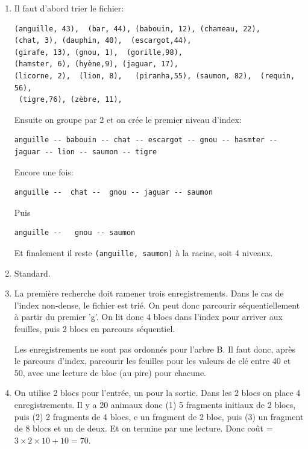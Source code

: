 \begin{solution}
\begin{enumerate}
  \item Il faut d'abord trier le fichier:
\begin{verbatim}
(anguille, 43),  (bar, 44), (babouin, 12), (chameau, 22),  
(chat, 3), (dauphin, 40),  (escargot,44),
(girafe, 13), (gnou, 1),  (gorille,98), 
(hamster, 6), (hyène,9), (jaguar, 17),  
(licorne, 2),  (lion, 8),   (piranha,55), (saumon, 82),  (requin, 56),
 (tigre,76), (zèbre, 11),
\end{verbatim}
 Ensuite on groupe par 2 et on crée le premier niveau d'index:
\begin{verbatim}
anguille -- babouin -- chat -- escargot -- gnou -- hasmter --
jaguar -- lion -- saumon -- tigre
\end{verbatim}

Encore une fois:
\begin{verbatim}
anguille --  chat --  gnou -- jaguar -- saumon 
\end{verbatim}

Puis
\begin{verbatim}
anguille --   gnou -- saumon 
\end{verbatim}

Et finalement il reste \texttt{(anguille, saumon)} à la racine, soit 4 niveaux.

  \item Standard.

  \item La première recherche doit ramener trois enregistrements. 
  Dans le cas de l'index non-dense, le fichier est trié.
     On peut donc parcourir séquentiellement à partir du
  premier 'g'. On lit donc 4 blocs dans l'index pour arriver aux feuilles, 
  puis 2 blocs en parcours séquentiel.
  
  Les enregistrements ne sont pas ordonnés pour l'arbre B. Il faut donc, après le
  parcours d'index, parcourir les feuilles pour les valeurs de clé entre 40 et 50,
  avec une lecture de bloc (au pire) pour chacune.

  \item On utilise 2 blocs pour l'entrée, un pour la sortie. Dans
   les 2 blocs on place 4 enregistrements. Il y a 20 animaux
   donc (1) 5 fragments initiaux de 2 blocs, puis (2)
    2 fragments de 4 blocs, e
    un  fragment de 2 bloc, puis (3) un fragment de 8 blocs et un  de deux.
   Et on termine par une lecture. Donc coût =$3 \times 2 \times 10 + 10 = 70$.
\end{enumerate}
\end{solution}

